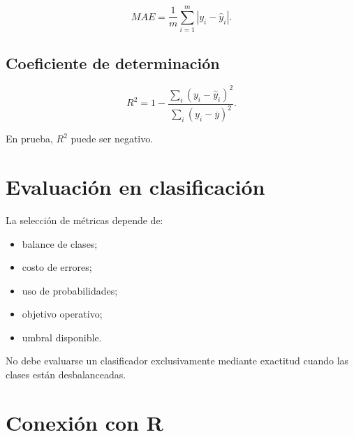 \documentclass[
  spanish,
  10.5pt,
  letterpaper,
  DIV=11,
  numbers=noendperiod,
  oneside,
  open=any]{scrreprt}
\providecommand{\tightlist}{%
  \setlength{\itemsep}{0pt}\setlength{\parskip}{0pt}}
\theoremstyle{definition}
\theoremstyle{definition}
\theoremstyle{plain}
\theoremstyle{remark}
\begin{document}
\[
MAE
=
\frac{1}{m}
\sum_{i=1}^{m}
|y_i-\widehat{y}_i|.
\]

\subsection*{Coeficiente de
determinación}\label{coeficiente-de-determinaciuxf3n}

\[
R^2
=
1-
\frac{
\sum_i(y_i-\widehat{y}_i)^2
}{
\sum_i(y_i-\overline{y})^2
}.
\]

En prueba, \(R^2\) puede ser negativo.

\section*{Evaluación en
clasificación}\label{evaluaciuxf3n-en-clasificaciuxf3n}


La selección de métricas depende de:

\begin{itemize}
\tightlist
\item
  balance de clases;
\item
  costo de errores;
\item
  uso de probabilidades;
\item
  objetivo operativo;
\item
  umbral disponible.
\end{itemize}

No debe evaluarse un clasificador exclusivamente mediante exactitud
cuando las clases están desbalanceadas.

\section*{Conexión con R}\label{conexiuxf3n-con-r-6}

\end{document}
